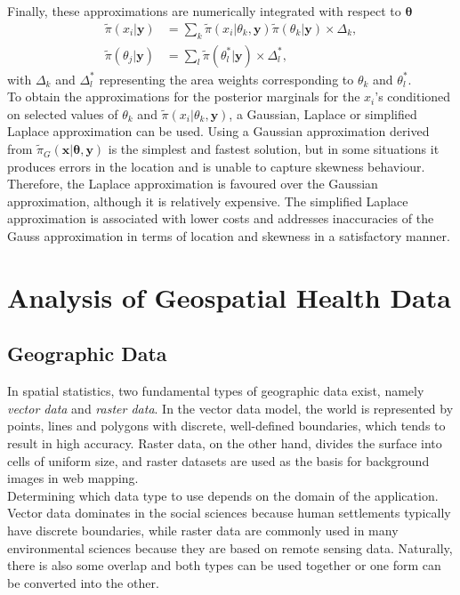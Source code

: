 \documentclass[12pt]{book}
\begin{document}
Finally, these approximations are numerically integrated with respect to $\pmb{\theta}$
\begin{align}
    \widetilde{\pi}\left(x_i|\pmb{y}\right)&=\sum_k\widetilde{\pi}\left(x_i|\theta_k,\pmb{y}\right)\widetilde{\pi}\left(\theta_k|\pmb{y}\right)\times\Delta_k,\\
    \widetilde{\pi}\left(\theta_j|\pmb{y}\right)&=\sum_l\widetilde{\pi}\left(\theta_l^*|\pmb{y}\right)\times\Delta_l^*,
\end{align}
with $\Delta_k$ and $\Delta_l^*$ representing the area weights corresponding to $\theta_k$ and $\theta_l^*$. \\
To obtain the approximations for the posterior marginals for the $x_i$'s conditioned on selected values of $\theta_k$ and $\widetilde{\pi}\left(x_i|\theta_k,\pmb{y}\right)$, a Gaussian, Laplace or simplified Laplace approximation can be used. Using a Gaussian approximation derived from $\widetilde{\pi}_G\left(\pmb{x}|\pmb{\theta},\pmb{y}\right)$ is the simplest and fastest solution, but in some situations it produces errors in the location and is unable to capture skewness behaviour. Therefore, the Laplace approximation is favoured over the Gaussian approximation, although it is relatively expensive. The simplified Laplace approximation is associated with lower costs and addresses inaccuracies of the Gauss approximation in terms of location and skewness in a satisfactory manner\autocite[Cf.][]{moraga2019geospatial}.
\chapter{Analysis of Geospatial Health Data}
\section{Geographic Data}
In spatial statistics, two fundamental types of geographic data exist, namely \textit{vector data} and \textit{raster data}. In the vector data model, the world is represented by points, lines and polygons with discrete, well-defined boundaries, which tends to result in high accuracy. Raster data, on the other hand, divides the surface into cells of uniform size, and raster datasets are used as the basis for background images in web mapping. \\
Determining which data type to use depends on the domain of the application. Vector data dominates in the social sciences because human settlements typically have discrete boundaries, while raster data are commonly used in many environmental sciences because they are based on remote sensing data. Naturally, there is also some overlap and both types can be used together or one form can be converted into the other.
\end{document}
